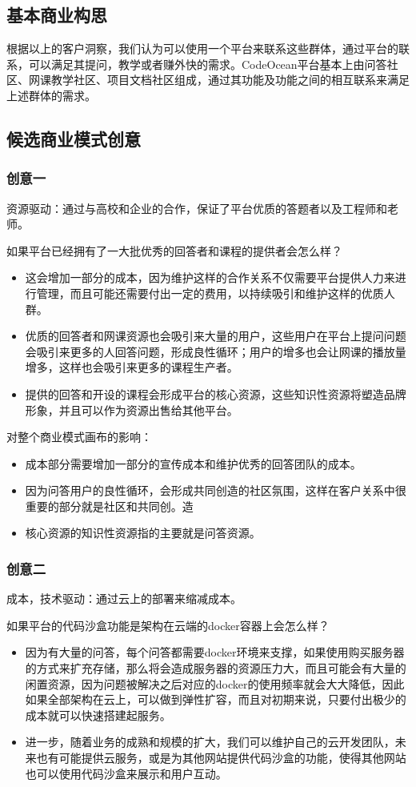 \documentclass[a4paper]{ctexart}
\begin{document}
\subsection{基本商业构思}
根据以上的客户洞察，我们认为可以使用一个平台来联系这些群体，通过平台的联系，可以满足其提问，教学或者赚外快的需求。CodeOcean平台基本上由问答社区、网课教学社区、项目文档社区组成，通过其功能及功能之间的相互联系来满足上述群体的需求。

\subsection{候选商业模式创意}
\subsubsection{创意一}
资源驱动：通过与高校和企业的合作，保证了平台优质的答题者以及工程师和老师。

如果平台已经拥有了一大批优秀的回答者和课程的提供者会怎么样？
\begin{itemize}
  \item 这会增加一部分的成本，因为维护这样的合作关系不仅需要平台提供人力来进行管理，而且可能还需要付出一定的费用，以持续吸引和维护这样的优质人群。
  \item 优质的回答者和网课资源也会吸引来大量的用户，这些用户在平台上提问问题会吸引来更多的人回答问题，形成良性循环；用户的增多也会让网课的播放量增多，这样也会吸引来更多的课程生产者。
  \item 提供的回答和开设的课程会形成平台的核心资源，这些知识性资源将塑造品牌形象，并且可以作为资源出售给其他平台。
\end{itemize}

对整个商业模式画布的影响：
\begin{itemize}
  \item 成本部分需要增加一部分的宣传成本和维护优秀的回答团队的成本。
  \item 因为问答用户的良性循环，会形成共同创造的社区氛围，这样在客户关系中很重要的部分就是社区和共同创。造
  \item 核心资源的知识性资源指的主要就是问答资源。
\end{itemize}

\subsubsection{创意二}
成本，技术驱动：通过云上的部署来缩减成本。

如果平台的代码沙盒功能是架构在云端的docker容器上会怎么样？
\begin{itemize}
  \item 因为有大量的问答，每个问答都需要docker环境来支撑，如果使用购买服务器的方式来扩充存储，那么将会造成服务器的资源压力大，而且可能会有大量的闲置资源，因为问题被解决之后对应的docker的使用频率就会大大降低，因此如果全部架构在云上，可以做到弹性扩容，而且对初期来说，只要付出极少的成本就可以快速搭建起服务。
  \item 进一步，随着业务的成熟和规模的扩大，我们可以维护自己的云开发团队，未来也有可能提供云服务，或是为其他网站提供代码沙盒的功能，使得其他网站也可以使用代码沙盒来展示和用户互动。
\end{itemize}
\end{document}
